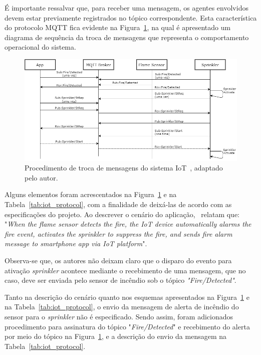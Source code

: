É importante ressalvar que, para receber uma mensagem, os agentes envolvidos devem estar previamente registrados no tópico correspondente. Esta característica do protocolo MQTT fica evidente na Figura~\ref{fig:estudo_msg}, na qual é apresentado um diagrama de sequência da troca de mensagens que representa o comportamento operacional do sistema.

\begin{figure}[ht]
	\centering
	\includegraphics[width=1\textwidth]{imagens/projeto_msg.png}
	\caption{Procedimento de troca de mensagens do sistema IoT~\cite{kang2017room}, adaptado pelo autor.
		\label{fig:estudo_msg}}
\end{figure}
\FloatBarrier

Alguns elementos foram acrescentados na Figura~\ref{fig:estudo_msg} e na Tabela~\ref{tab:iot_protocol}, com a finalidade de deixá-las de acordo com as especificações do projeto. Ao descrever o cenário do aplicação,~\citeauthor{kang2017room} relatam que: "\textit{When the flame sensor detects the fire, the IoT device automatically alarms the fire event, activates the sprinkler to suppress the fire, and sends fire alarm message to smartphone app via IoT platform}". 

Observa-se que, os autores não deixam claro que o disparo do evento para ativação \textit{sprinkler} acontece mediante o recebimento de uma mensagem, que no caso, deve ser enviada pelo sensor de incêndio sob o tópico \textit{"Fire/Detected"}. 

Tanto na descrição do cenário quanto nos esquemas apresentados na Figura~\ref{fig:estudo_msg} e na Tabela~\ref{tab:iot_protocol}, o envio da mensagem de alerta de incêndio do sensor para o \textit{sprinkler} não é especificado. Sendo assim, foram adicionados procedimento para assinatura do tópico "\textit{Fire/Detected}" e recebimento do alerta por meio do tópico na Figura~\ref{fig:estudo_msg}, e a descrição do envio da mensagem na Tabela~\ref{tab:iot_protocol}.

